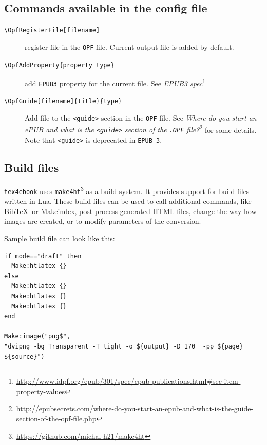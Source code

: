 \hypertarget{commands-available-in-the-config-file}{%
\subsection{Commands available in the config
file}\label{commands-available-in-the-config-file}}

\begin{description}
\item[\texttt{\textbackslash{}OpfRegisterFile{[}filename{]}}]
register file in the \texttt{OPF} file. Current output file is added by
default.
\item[\texttt{\textbackslash{}OpfAddProperty\{property\ type\}}]
add \texttt{EPUB3} property for the current file. See \emph{EPUB3
spec}\footnote{\url{http://www.idpf.org/epub/301/spec/epub-publications.html\#sec-item-property-values}}
\item[\texttt{\textbackslash{}OpfGuide{[}filename{]}\{title\}\{type\}}]
Add file to the \texttt{\textless{}guide\textgreater{}} section in the
\texttt{OPF} file. See \emph{Where do you start an ePUB and what is the
\texttt{\textless{}guide\textgreater{}} section of the \texttt{.OPF}
file?}\footnote{\url{http://epubsecrets.com/where-do-you-start-an-epub-and-what-is-the-guide-section-of-the-opf-file.php}}
for some details. Note that \texttt{\textless{}guide\textgreater{}} is
deprecated in \texttt{EPUB\ 3}.
\end{description}

\hypertarget{build-files}{%
\subsection{Build files}\label{build-files}}

\texttt{tex4ebook} uses \texttt{make4ht}\footnote{\url{https://github.com/michal-h21/make4ht}}
as a build system. It provides support for build files written in Lua.
These build files can be used to call additional commands, like
Bib\TeX~or Makeindex, post-process generated HTML files, change the way
how images are created, or to modify parameters of the conversion.

Sample build file can look like this:

\begin{verbatim}
if mode=="draft" then
  Make:htlatex {}
else
  Make:htlatex {}
  Make:htlatex {}
  Make:htlatex {}
end

Make:image("png$",
"dvipng -bg Transparent -T tight -o ${output} -D 170  -pp ${page} ${source}")
\end{verbatim}

